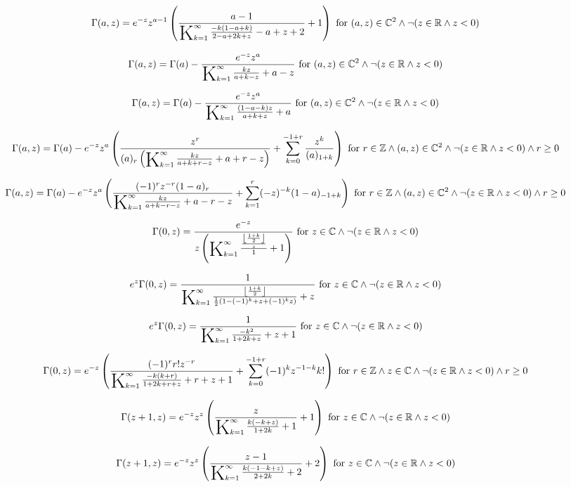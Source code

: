 \documentclass{article}
\newcommand{\bigK}{\mathop{\raisebox{-5pt}{\huge K}}}
\begin{document}
\[\Gamma (a,z)=e^{-z} z^{a-1} \left(\frac{a-1}{\bigK_{k=1}^{\infty}\frac{-k (1-a+k)}{2-a+2 k+z}-a+z+2}+1\right)\text{ for }(a,z)\in \mathbb{C}^2\land \neg (z\in \mathbb{R}\land z<0)\] 

\[\Gamma (a,z)=\Gamma (a)-\frac{e^{-z} z^a}{\bigK_{k=1}^{\infty}\frac{k z}{a+k-z}+a-z}\text{ for }(a,z)\in \mathbb{C}^2\land \neg (z\in \mathbb{R}\land z<0)\] 

\[\Gamma (a,z)=\Gamma (a)-\frac{e^{-z} z^a}{\bigK_{k=1}^{\infty}\frac{(1-a-k) z}{a+k+z}+a}\text{ for }(a,z)\in \mathbb{C}^2\land \neg (z\in \mathbb{R}\land z<0)\] 

\[\Gamma (a,z)=\Gamma (a)-e^{-z} z^a \left(\frac{z^r}{(a)_r \left(\bigK_{k=1}^{\infty}\frac{k z}{a+k+r-z}+a+r-z\right)}+\sum _{k=0}^{-1+r} \frac{z^k}{(a)_{1+k}}\right)\text{ for }r\in \mathbb{Z}\land (a,z)\in \mathbb{C}^2\land \neg (z\in \mathbb{R}\land z<0)\land r\geq 0\] 

\[\Gamma (a,z)=\Gamma (a)-e^{-z} z^a \left(\frac{(-1)^r z^{-r} (1-a)_r}{\bigK_{k=1}^{\infty}\frac{k z}{a+k-r-z}+a-r-z}+\sum _{k=1}^r (-z)^{-k} (1-a)_{-1+k}\right)\text{ for }r\in \mathbb{Z}\land (a,z)\in \mathbb{C}^2\land \neg (z\in \mathbb{R}\land z<0)\land r\geq 0\] 

\[\Gamma (0,z)=\frac{e^{-z}}{z \left(\bigK_{k=1}^{\infty}\frac{\frac{\left\lfloor \frac{1+k}{2}\right\rfloor }{z}}{1}+1\right)}\text{ for }z\in \mathbb{C}\land \neg (z\in \mathbb{R}\land z<0)\] 

\[e^z \Gamma (0,z)=\frac{1}{\bigK_{k=1}^{\infty}\frac{\left\lfloor \frac{1+k}{2}\right\rfloor }{\frac{1}{2} \left(1-(-1)^k+z+(-1)^k z\right)}+z}\text{ for }z\in \mathbb{C}\land \neg (z\in \mathbb{R}\land z<0)\] 

\[e^z \Gamma (0,z)=\frac{1}{\bigK_{k=1}^{\infty}\frac{-k^2}{1+2 k+z}+z+1}\text{ for }z\in \mathbb{C}\land \neg (z\in \mathbb{R}\land z<0)\] 

\[\Gamma (0,z)=e^{-z} \left(\frac{(-1)^r r! z^{-r}}{\bigK_{k=1}^{\infty}\frac{-k (k+r)}{1+2 k+r+z}+r+z+1}+\sum _{k=0}^{-1+r} (-1)^k z^{-1-k} k!\right)\text{ for }r\in \mathbb{Z}\land z\in \mathbb{C}\land \neg (z\in \mathbb{R}\land z<0)\land r\geq 0\] 

\[\Gamma (z+1,z)=e^{-z} z^z \left(\frac{z}{\bigK_{k=1}^{\infty}\frac{k (-k+z)}{1+2 k}+1}+1\right)\text{ for }z\in \mathbb{C}\land \neg (z\in \mathbb{R}\land z<0)\] 

\[\Gamma (z+1,z)=e^{-z} z^z \left(\frac{z-1}{\bigK_{k=1}^{\infty}\frac{k (-1-k+z)}{2+2 k}+2}+2\right)\text{ for }z\in \mathbb{C}\land \neg (z\in \mathbb{R}\land z<0)\] 
\end{document}
